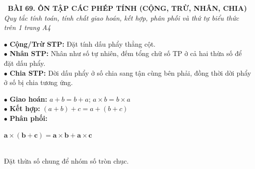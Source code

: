 \documentclass[14pt,a4paper,oneside]{extbook}
\begin{document}
\noindent
\begin{tcolorbox}[
  enhanced,
  colback=teal!8!white,
  colframe=teal!80!black,
  arc=3mm,
  boxrule=1.1pt,
  width=\linewidth,
  halign=center,
  top=2.2mm, bottom=2.2mm,
  left=3mm, right=3mm,
  drop fuzzy shadow
]
  {\large\bfseries\color{teal!95!black}\faBookmark\ BÀI 69. ÔN TẬP CÁC PHÉP TÍNH (CỘNG, TRỪ, NHÂN, CHIA)}\\[2pt]
  {\scriptsize\color{black!75}\itshape Quy tắc tính toán, tính chất giao hoán, kết hợp, phân phối và thứ tự biểu thức trên 1 trang A4}
\end{tcolorbox}

\vspace{3.2mm}
\noindent
\begin{minipage}[t]{0.54\textwidth}
  \begin{tcolorbox}[
    enhanced,
    title={\footnotesize\bfseries\color{white}\faCalculator\ 1. Quy tắc bốn phép tính},
    colback=blue!2!white,
    colframe=blue!75!black,
    arc=2.5mm, boxrule=0.8pt, top=1.8mm, bottom=1.8mm, left=2.2mm, right=2.2mm
  ]
    \footnotesize
    $\bullet$ \textbf{Cộng/Trừ STP:} Đặt tính dấu phẩy thẳng cột.\\
    $\bullet$ \textbf{Nhân STP:} Nhân như số tự nhiên, đếm tổng chữ số TP ở cả hai thừa số để đặt dấu phẩy.\\
    $\bullet$ \textbf{Chia STP:} Dời dấu phẩy ở số chia sang tận cùng bên phải, đồng thời dời phẩy ở số bị chia tương ứng.
  \end{tcolorbox}
\end{minipage}%
\hfill
\begin{minipage}[t]{0.44\textwidth}
  \begin{tcolorbox}[
    enhanced,
    title={\footnotesize\bfseries\color{white}\faBolt\ 2. Tính chất tính nhanh},
    colback=teal!2!white,
    colframe=teal!75!black,
    arc=2.5mm, boxrule=0.8pt, top=1.8mm, bottom=1.8mm, left=2mm, right=2mm
  ]
    \footnotesize
    $\bullet$ \textbf{Giao hoán:} $a + b = b + a$; $a \times b = b \times a$\\
    $\bullet$ \textbf{Kết hợp:} $(a+b)+c = a+(b+c)$\\
    $\bullet$ \textbf{Phân phối:}\\
    \centerline{$\mathbf{a \times (b + c) = a \times b + a \times c}$}\\
    Đặt thừa số chung để nhóm số tròn chục.
  \end{tcolorbox}
\end{minipage}
\end{document}
